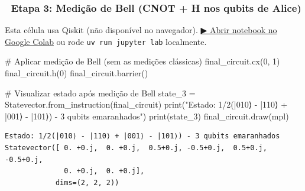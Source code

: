 \documentclass[
  brazilian,
]{report}
\newenvironment{Shaded}{\begin{snugshade}}{\end{snugshade}}
\newcommand{\BuiltInTok}[1]{\textcolor[rgb]{0.00,0.23,0.31}{#1}}
\newcommand{\CommentTok}[1]{\textcolor[rgb]{0.37,0.37,0.37}{#1}}
\newcommand{\DecValTok}[1]{\textcolor[rgb]{0.68,0.00,0.00}{#1}}
\newcommand{\NormalTok}[1]{\textcolor[rgb]{0.00,0.23,0.31}{#1}}
\newcommand{\OperatorTok}[1]{\textcolor[rgb]{0.37,0.37,0.37}{#1}}
\newcommand{\StringTok}[1]{\textcolor[rgb]{0.13,0.47,0.30}{#1}}
\begin{document}
\subsubsection{🔹 Etapa 3: Medição de Bell (CNOT + H nos qubits de
Alice)}\label{etapa-3-mediuxe7uxe3o-de-bell-cnot-h-nos-qubits-de-alice}

\begin{tcolorbox}[enhanced jigsaw, arc=.35mm, bottomrule=.15mm, bottomtitle=1mm, breakable, colback=white, colbacktitle=quarto-callout-warning-color!10!white, colframe=quarto-callout-warning-color-frame, coltitle=black, left=2mm, leftrule=.75mm, opacityback=0, opacitybacktitle=0.6, rightrule=.15mm, title=\textcolor{quarto-callout-warning-color}{\faExclamationTriangle}\hspace{0.5em}{⚛️ Célula Qiskit --- execute no Colab ou localmente}, titlerule=0mm, toprule=.15mm, toptitle=1mm]

Esta célula usa Qiskit (não disponível no navegador).
\href{https://colab.research.google.com/github/maxwellamaral/aula-quantum/blob/main/notebooks/02-teletransport.ipynb}{▶
Abrir notebook no Google Colab} ou rode \texttt{uv\ run\ jupyter\ lab}
localmente.

\begin{Shaded}
\begin{Highlighting}[]

\CommentTok{\# Aplicar medição de Bell (sem as medições clássicas)}
\NormalTok{final\_circuit.cx(}\DecValTok{0}\NormalTok{, }\DecValTok{1}\NormalTok{)}
\NormalTok{final\_circuit.h(}\DecValTok{0}\NormalTok{)}
\NormalTok{final\_circuit.barrier()}

\CommentTok{\# Visualizar estado após medição de Bell}
\NormalTok{state\_3 }\OperatorTok{=}\NormalTok{ Statevector.from\_instruction(final\_circuit)}
\BuiltInTok{print}\NormalTok{(}\StringTok{"Estado: 1/2(|010⟩ {-} |110⟩ + |001⟩ {-} |101⟩) {-} 3 qubits emaranhados"}\NormalTok{)}
\BuiltInTok{print}\NormalTok{(state\_3)}
\NormalTok{final\_circuit.draw(}\StringTok{\textquotesingle{}mpl\textquotesingle{}}\NormalTok{)}
\end{Highlighting}
\end{Shaded}

\end{tcolorbox}

\begin{verbatim}
Estado: 1/2(|010⟩ - |110⟩ + |001⟩ - |101⟩) - 3 qubits emaranhados
Statevector([ 0. +0.j,  0. +0.j,  0.5+0.j, -0.5+0.j,  0.5+0.j, -0.5+0.j,
              0. +0.j,  0. +0.j],
            dims=(2, 2, 2))
\end{verbatim}
\end{document}

